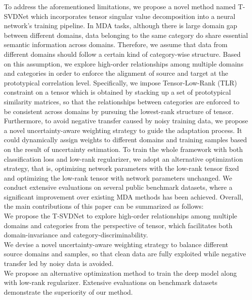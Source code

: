 \documentclass[10pt,twocolumn,letterpaper]{article}
\begin{document}
To address the aforementioned limitations, we propose a novel method named T-SVDNet which incorporates tensor singular value decomposition into a neural network's training pipeline. In MDA tasks, although there is large domain gap between different domains, data belonging to the same category do share essential semantic information across domains. Therefore, we assume that data from different domains should follow a certain kind of category-wise structure. Based on this assumption, we explore high-order relationships among multiple domains and categories in order to enforce the alignment of source and target at the prototypical correlation level. Specifically, we impose Tensor-Low-Rank (TLR) constraint on a tensor which is obtained by stacking up a set of prototypical similarity matrices, so that the relationships between categories are enforced to be consistent across domains by pursuing the lowest-rank structure of tensor. Furthermore, to avoid negative transfer \cite{pan2009survey} caused by noisy training data, we propose a novel uncertainty-aware weighting strategy to guide the adaptation process. It could dynamically assign weights to different domains and training samples based on the result of uncertainty estimation. To train the whole framework with both classification loss and low-rank regularizer, we adopt an alternative optimization strategy, that is, optimizing network parameters with the low-rank tensor fixed and optimizing the low-rank tensor with network parameters unchanged. We conduct extensive evaluations on several public benchmark datasets, where a significant improvement over existing MDA methods has been achieved. Overall, the main contributions of this paper can be summarized as follows:\\
 We propose the T-SVDNet to explore high-order relationships among multiple domains and categories from the perspective of tensor, which facilitates both domain-invariance and category-discriminability.\\
 We devise a novel uncertainty-aware weighting strategy to balance different source domains and samples, so that clean data are fully exploited while negative transfer led by noisy data is avoided. \\
 We propose an alternative optimization method to train the deep model along with low-rank regularizer. Extensive evaluations on benchmark datasets demonstrate the superiority of our method. 
\end{document}
